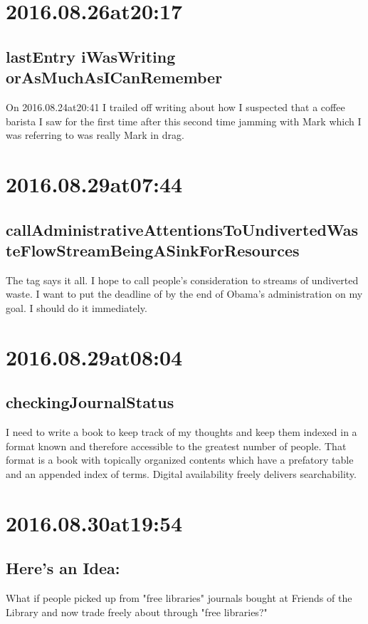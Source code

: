 \begin{enumerate}
\begin{enumerate}
\section*{ 2016.08.26at20:17 }
\subsection*{lastEntry iWasWriting orAsMuchAsICanRemember}
On 2016.08.24at20:41 I trailed off writing about how I suspected that a coffee barista I saw for the first time after this second time jamming with Mark which I was referring to was really Mark in drag.

\section*{ 2016.08.29at07:44 }
\subsection*{callAdministrativeAttentionsToUndivertedWasteFlowStreamBeingASinkForResources}
The tag says it all. I hope to call people's consideration to streams of undiverted waste. I want to put the deadline of by the end of Obama's administration on my goal. I should do it immediately.

\section*{ 2016.08.29at08:04 }
\subsection*{checkingJournalStatus}
I need to write a book to keep track of my thoughts and keep them indexed in a format known and therefore accessible to the greatest number of people. That format is a book with topically organized contents which have a prefatory table and an appended index of terms. Digital availability freely delivers searchability.

\section*{ 2016.08.30at19:54 }
\subsection*{Here's an Idea:}
What if people picked up from "free libraries" journals bought at Friends of the Library and now trade freely about through "free libraries?"


\end{enumerate}
\end{enumerate}
